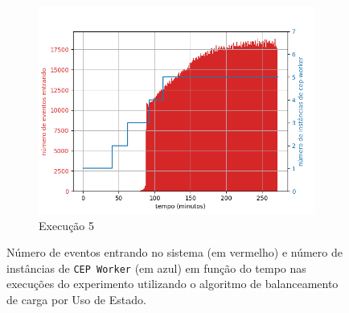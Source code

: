 \begin{figure}[p]
\begin{subfigure}{.5\textwidth}
  \centering
  \includegraphics[width=\linewidth]{figuras/graphics/carga_e_workers_total10-dez-su.png}  
  \caption{Execução 5}
  \label{fig:cewt-10-dez-su}
\end{subfigure}
\caption{Número de eventos entrando no sistema (em vermelho) e número de instâncias de \texttt{CEP Worker} (em azul) em função do tempo nas execuções do experimento utilizando o algoritmo de balanceamento de carga por Uso de Estado.}
\label{fig:workers_and_events_SU}
\end{figure}

